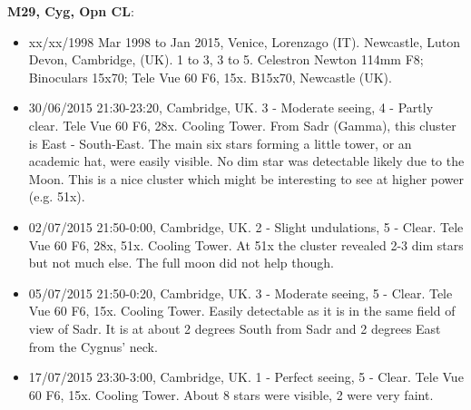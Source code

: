 {\bf M29, Cyg, Opn CL}:
\begin{itemize}
\item xx/xx/1998 Mar 1998 to Jan 2015, Venice, Lorenzago (IT). Newcastle, Luton Devon, Cambridge, (UK). 1 to 3, 3 to 5. Celestron Newton 114mm F8; Binoculars 15x70; Tele Vue 60 F6, 15x. B15x70, Newcastle (UK).
\item 30/06/2015 21:30-23:20, Cambridge, UK. 3 - Moderate seeing, 4 - Partly clear. Tele Vue 60 F6, 28x. Cooling Tower. From Sadr (Gamma), this cluster is East - South-East. The main six stars forming a little tower, or an academic hat, were easily visible. No dim star was detectable likely due to the Moon. This is a nice cluster which might be interesting to see at higher power (e.g. 51x). 
\item 02/07/2015 21:50-0:00, Cambridge, UK. 2 - Slight undulations, 5 - Clear. Tele Vue 60 F6, 28x, 51x. Cooling Tower. At 51x the cluster revealed 2-3 dim stars but not much else. The full moon did not help though.
\item 05/07/2015 21:50-0:20, Cambridge, UK. 3 - Moderate seeing, 5 - Clear. Tele Vue 60 F6, 15x. Cooling Tower. Easily detectable as it is in the same field of view of Sadr. It is at about 2 degrees South from Sadr and 2 degrees East from the Cygnus' neck.
\item 17/07/2015 23:30-3:00, Cambridge, UK. 1 - Perfect seeing, 5 - Clear. Tele Vue 60 F6, 15x. Cooling Tower. About 8 stars were visible, 2 were very faint.
\end{itemize}
